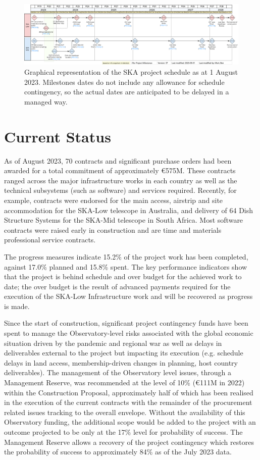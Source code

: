 \documentclass[a4paper,
               biblatex,     %
               keeplastbox,   %
               ]{jacow}
\begin{document}
 \begin{figure}[tb]
	\centering
	  \includegraphics[width=\textwidth]{FR1BCO03f2.png}
	\caption{
		Graphical representation of the SKA project schedule as at 1 August 2023. Milestones dates do not include any allowance for schedule contingency, so the actual dates are anticipated to be delayed in a managed way.
	}
	\label{fig:ska-timeline}
  \end{figure}

\section{Current Status}
As of August 2023, 70 contracts and significant purchase orders had been awarded for a total commitment of approximately €575M. These contracts ranged across the major infrastructure works in each country as well as the technical subsystems (such as software) and services required. Recently, for example, contracts were endorsed for the main access, airstrip and site accommodation for the SKA-Low telescope in Australia, and delivery of 64 Dish Structure Systems for the SKA-Mid telescope in South Africa. Most software contracts were raised early in construction and are time and materials professional service contracts.

The progress measures indicate 15.2\% of the project work has been completed, against 17.0\% planned and 15.8\% spent.  The key performance indicators show that the project is behind schedule and over budget for the achieved work to date; the over budget is the result of advanced payments required for the execution of the SKA-Low Infrastructure work and will be recovered as progress is made.

Since the start of construction, significant project contingency funds have been spent to manage the Observatory-level risks associated with the global economic situation driven by the pandemic and regional war as well as delays in deliverables external to the project but impacting its execution (e.g. schedule delays in land access, membership-driven changes in planning, host country deliverables). The management of the Observatory level issues, through a Management Reserve, was recommended at the level of 10\% (€111M in 2022) within the Construction Proposal, approximately half of which has been realised in the execution of the current contracts with the remainder of the procurement related issues tracking to the overall envelope. Without the availability of this Observatory funding, the additional scope would be added to the project with an outcome projected to be only at the 17\% level for probability of success. The Management Reserve allows a recovery of the project contingency which restores the probability of success to approximately 84\% as of the July 2023 data.
\end{document}
